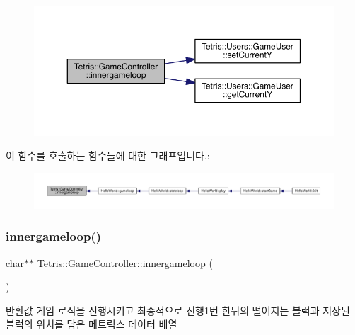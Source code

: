 \begin{figure}[H]
\begin{center}
\leavevmode
\includegraphics[width=350pt]{db/dd2/class_tetris_1_1_game_controller_a9dd5159934835ef54cb3c0b24cbc1fd6_cgraph}
\end{center}
\end{figure}
이 함수를 호출하는 함수들에 대한 그래프입니다.\+:
\nopagebreak
\begin{figure}[H]
\begin{center}
\leavevmode
\includegraphics[width=350pt]{db/dd2/class_tetris_1_1_game_controller_a9dd5159934835ef54cb3c0b24cbc1fd6_icgraph}
\end{center}
\end{figure}
\mbox{\label{class_tetris_1_1_game_controller_a028a1a0270750bcae1e2e2cbbbe7609a}} 
\subsubsection{\texorpdfstring{innergameloop()}{innergameloop()}\hspace{0.1cm}{\footnotesize\ttfamily [2/2]}}
{\footnotesize\ttfamily char$\ast$$\ast$ Tetris\+::\+Game\+Controller\+::innergameloop (\begin{DoxyParamCaption}{ }\end{DoxyParamCaption})\hspace{0.3cm}{\ttfamily [inline]}}

\begin{DoxyReturn}{반환값}
게임 로직을 진행시키고 최종적으로 진행1번 한뒤의 떨어지는 블럭과 저장된 블럭의 위치를 담은 메트릭스 데이터 배열 
\end{DoxyReturn}


